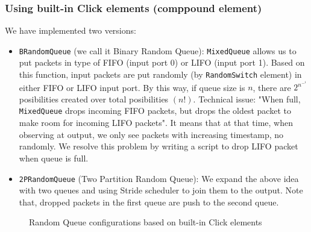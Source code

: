 \documentclass[a4paper]{article}
\begin{document}
  \subsubsection{Using built-in Click elements (comppound element)}
  We have implemented two versions:
  \begin{itemize}
  	\item \texttt{BRandomQueue} (we call it Binary Random Queue): \texttt{MixedQueue} allows us to put packets in type of FIFO (input port 0) or LIFO (input port 1). Based on this function, input packets are put randomly (by \texttt{RandomSwitch} element) in either FIFO or LIFO input port. By this way, if queue size is $n$, there are $2^n^-^1$ posibilities created over total posibilities $(n!)$. Technical issue: "When full, \texttt{MixedQueue} drops incoming FIFO packets, but drops the  oldest  packet to make room for incoming LIFO packets". It means that at that time, when observing at output, we only see packets with increasing timestamp, no randomly. We resolve this problem by writing a script to drop LIFO packet when queue is full.
  	\item \texttt{2PRandomQueue} (Two Partition Random Queue): We expand the above idea with two queues and using Stride scheduler to join them to the output. Note that, dropped packets in the first queue are push to the second queue.
  \end{itemize}
  \begin{figure}[ht]
      \centering
      
      
      \caption{Random Queue configurations based on built-in Click elements}
      \label{fig:clickrandomqueue}
  \end{figure}
  
\end{document}
